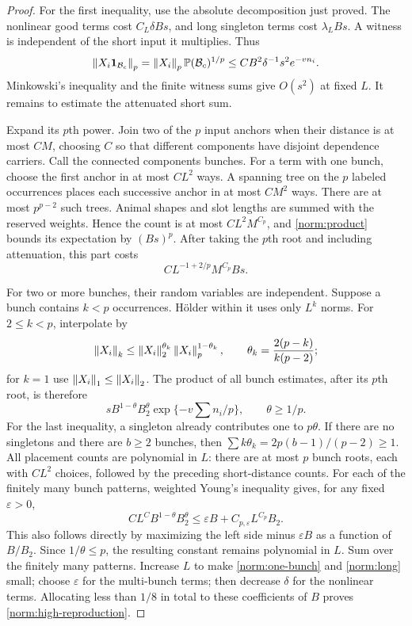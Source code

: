 \begin{proof}
For the first inequality, use the absolute decomposition just proved.
The nonlinear good terms cost $C_L\delta Bs$, and long singleton terms
cost $\lambda_LBs$.  A witness is independent of the short input it
multiplies.  Thus
\[
 \left\lVert X_i\mathbf 1_{\mathcal B_c}\right\rVert_p
  =\left\lVert X_i\right\rVert_p\mathbb P(\mathcal B_c)^{1/p}
  \le C B^2\delta^{-1}s^2e^{-vn_i}.
\]
Minkowski's inequality and the finite witness sums give $O(s^2)$ at
fixed $L$.  It remains to estimate the attenuated short sum.

Expand its $p$th power.  Join two of the $p$ input anchors when their
distance is at most $C M$, choosing $C$ so that different components
have disjoint dependence carriers.  Call the connected components
bunches.  For a term with one bunch, choose the first anchor in at most
$CL^2$ ways.  A spanning tree on the $p$ labeled occurrences places
each successive anchor in at most $CM^2$ ways.  There are at most
$p^{p-2}$ such trees.  Animal shapes and slot lengths are summed with
the reserved weights.  Hence the count is at most $CL^2M^{C_p}$, and
\eqref{norm:product} bounds its expectation by $(Bs)^p$.  After taking
the $p$th root and including attenuation, this part costs
\begin{equation}\label{norm:one-bunch}
                 C L^{-1+2/p}M^{C_p} Bs.
\end{equation}

For two or more bunches, their random variables are independent.
Suppose a bunch contains $k<p$ occurrences.  H\"older within it uses
only $L^k$ norms.  For $2\le k<p$, interpolate by
\[
 \left\lVert X_i\right\rVert_k\le\left\lVert X_i\right\rVert_2^{\theta_k}
                   \left\lVert X_i\right\rVert_p^{1-\theta_k},
 \qquad \theta_k=\frac{2(p-k)}{k(p-2)};
\]
for $k=1$ use $\left\lVert X_i\right\rVert_1\le\left\lVert X_i\right\rVert_2$.  The product of all
bunch estimates, after its $p$th root, is therefore
\[
 s B^{1-\theta}B_2^\theta
   \exp\{-v\textstyle\sum n_i/p\},\qquad \theta\ge1/p.
\]
For the last inequality, a singleton already contributes one to
$p\theta$.  If there are no singletons and there are $b\ge2$ bunches,
then $\sum k\theta_k=2p(b-1)/(p-2)\ge1$.  All placement
counts are polynomial in $L$: there are at most $p$ bunch roots, each
with $CL^2$ choices, followed by the preceding short-distance counts.
For each of the finitely many bunch patterns, weighted Young's
inequality gives, for any fixed $\varepsilon>0$,
\[
 C L^C B^{1-\theta}B_2^\theta
       \le\varepsilon B+C_{p,\varepsilon}L^{C_p}B_2.
\]
This also follows directly by maximizing the left side minus
$\varepsilon B$ as a function of $B/B_2$.  Since $1/\theta\le p$,
the resulting constant remains polynomial in $L$.  Sum over the
finitely many patterns.  Increase $L$ to make \eqref{norm:one-bunch}
and \eqref{norm:long} small; choose $\varepsilon$ for the multi-bunch
terms; then decrease $\delta$ for the nonlinear terms.  Allocating
less than $1/8$ in total to these coefficients of $B$ proves
\eqref{norm:high-reproduction}.


\end{proof}
